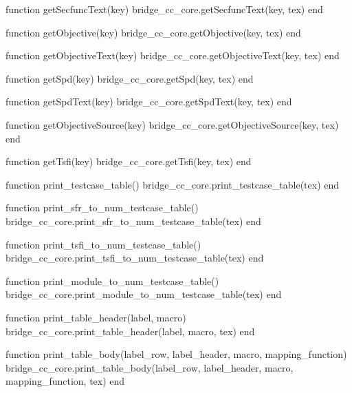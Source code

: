 \begin{luacode}
  function getSecfuncText(key)
    bridge_cc_core.getSecfuncText(key, tex)
  end

  function getObjective(key)
    bridge_cc_core.getObjective(key, tex)
  end

  function getObjectiveText(key)
    bridge_cc_core.getObjectiveText(key, tex)
  end

  function getSpd(key)
    bridge_cc_core.getSpd(key, tex)
  end

  function getSpdText(key)
    bridge_cc_core.getSpdText(key, tex)
  end

  function getObjectiveSource(key)
    bridge_cc_core.getObjectiveSource(key, tex)
  end

  function getTsfi(key)
    bridge_cc_core.getTsfi(key, tex)
  end

  function print_testcase_table()
    bridge_cc_core.print_testcase_table(tex)
  end

  function print_sfr_to_num_testcase_table()
    bridge_cc_core.print_sfr_to_num_testcase_table(tex)
  end

  function print_tsfi_to_num_testcase_table()
    bridge_cc_core.print_tsfi_to_num_testcase_table(tex)
  end

  function print_module_to_num_testcase_table()
    bridge_cc_core.print_module_to_num_testcase_table(tex)
  end

  function print_table_header(label, macro)
    bridge_cc_core.print_table_header(label, macro, tex)
  end

  function print_table_body(label_row, label_header, macro, mapping_function)
    bridge_cc_core.print_table_body(label_row, label_header, macro, mapping_function, tex)
  end

\end{luacode}
